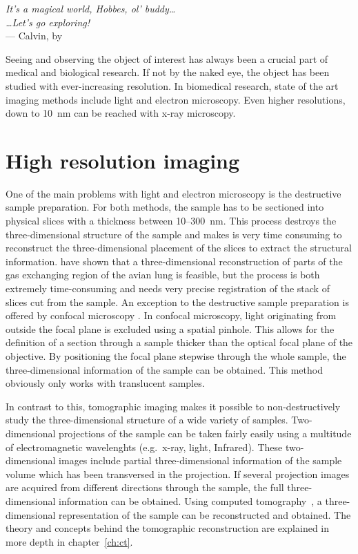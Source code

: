 \label{ch:Introduction}
\begin{flushright}{\slshape    
		It's a magical world, Hobbes, ol' buddy\dots\\
		\dots Let's go exploring!}\\ \medskip
		--- Calvin, by \citep{Watterson1996}
\end{flushright}
\bigskip
{}
Seeing and observing the object of interest has always been a crucial part of medical and biological research. If not by the naked eye, the object has been studied with ever-increasing resolution. In biomedical research, state of the art imaging methods include light and electron microscopy. Even higher resolutions, down to \SI{10}{\nano\meter}  can be reached with x-ray microscopy.

\section{High resolution imaging}
One of the main problems with light and electron microscopy is the destructive sample preparation. For both methods, the sample has to be sectioned into physical slices with a thickness between 10--\SI{300}{\nano\meter}. This process destroys the three-dimensional structure of the sample and makes is very time consuming to reconstruct the three-dimensional placement of the slices to extract the structural information. \citet{Woodward2005} have shown that a three-dimensional reconstruction of parts of the gas exchanging region of the avian lung is feasible, but the process is both extremely time-consuming and needs very precise registration of the stack of slices cut from the sample. An exception to the destructive sample preparation is offered by confocal microscopy \cite{Minsky1961}. In confocal microscopy, light originating from outside the focal plane is excluded using a spatial pinhole. This allows for the definition of a section through a sample thicker than the optical focal plane of the objective. By positioning the focal plane stepwise through the whole sample, the three-dimensional information of the sample can be obtained. This method obviously only works with translucent samples.

In contrast to this, tomographic imaging makes it possible to non-destructively study the three-dimensional structure of a wide variety of samples. Two-dimensional projections of the sample can be taken fairly easily using a multitude of electromagnetic wavelenghts (e.g.\ x-ray, light, Infrared). These two-dimensional images include partial three-dimensional information of the sample volume which has been transversed in the projection. If several projection images are acquired from different directions through the sample, the full three-dimensional information can be obtained. Using computed tomography~\cite{Hounsfield1976a}, a three-dimensional representation of the sample can be reconstructed and obtained. The theory and concepts behind the tomographic reconstruction are explained in more depth in chapter~\ref{ch:ct}.

